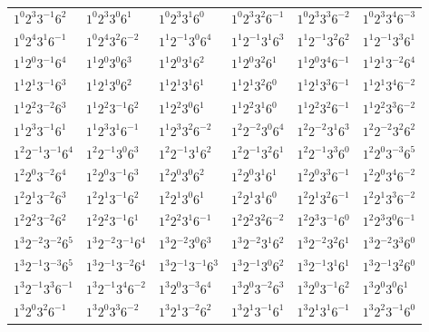 \documentclass[12pt]{amsart}
\numberwithin{equation}{section}
\theoremstyle{plain}
\theoremstyle{definition}
\theoremstyle{remark}
\begin{document}
\begin{longtable}{llllll}
$1^{0}2^{3}3^{-1}6^{2}$ & $1^{0}2^{3}3^{0}6^{1}$ & $1^{0}2^{3}3^{1}6^{0}$ & $1^{0}2^{3}3^{2}6^{-1}$ & $1^{0}2^{3}3^{3}6^{-2}$ & $1^{0}2^{3}3^{4}6^{-3}$\\
$1^{0}2^{4}3^{1}6^{-1}$ & $1^{0}2^{4}3^{2}6^{-2}$ & $1^{1}2^{-1}3^{0}6^{4}$ & $1^{1}2^{-1}3^{1}6^{3}$ & $1^{1}2^{-1}3^{2}6^{2}$ & $1^{1}2^{-1}3^{3}6^{1}$\\
$1^{1}2^{0}3^{-1}6^{4}$ & $1^{1}2^{0}3^{0}6^{3}$ & $1^{1}2^{0}3^{1}6^{2}$ & $1^{1}2^{0}3^{2}6^{1}$ & $1^{1}2^{0}3^{4}6^{-1}$ & $1^{1}2^{1}3^{-2}6^{4}$\\
$1^{1}2^{1}3^{-1}6^{3}$ & $1^{1}2^{1}3^{0}6^{2}$ & $1^{1}2^{1}3^{1}6^{1}$ & $1^{1}2^{1}3^{2}6^{0}$ & $1^{1}2^{1}3^{3}6^{-1}$ & $1^{1}2^{1}3^{4}6^{-2}$\\
$1^{1}2^{2}3^{-2}6^{3}$ & $1^{1}2^{2}3^{-1}6^{2}$ & $1^{1}2^{2}3^{0}6^{1}$ & $1^{1}2^{2}3^{1}6^{0}$ & $1^{1}2^{2}3^{2}6^{-1}$ & $1^{1}2^{2}3^{3}6^{-2}$\\
$1^{1}2^{3}3^{-1}6^{1}$ & $1^{1}2^{3}3^{1}6^{-1}$ & $1^{1}2^{3}3^{2}6^{-2}$ & $1^{2}2^{-2}3^{0}6^{4}$ & $1^{2}2^{-2}3^{1}6^{3}$ & $1^{2}2^{-2}3^{2}6^{2}$\\
$1^{2}2^{-1}3^{-1}6^{4}$ & $1^{2}2^{-1}3^{0}6^{3}$ & $1^{2}2^{-1}3^{1}6^{2}$ & $1^{2}2^{-1}3^{2}6^{1}$ & $1^{2}2^{-1}3^{3}6^{0}$ & $1^{2}2^{0}3^{-3}6^{5}$\\
$1^{2}2^{0}3^{-2}6^{4}$ & $1^{2}2^{0}3^{-1}6^{3}$ & $1^{2}2^{0}3^{0}6^{2}$ & $1^{2}2^{0}3^{1}6^{1}$ & $1^{2}2^{0}3^{3}6^{-1}$ & $1^{2}2^{0}3^{4}6^{-2}$\\
$1^{2}2^{1}3^{-2}6^{3}$ & $1^{2}2^{1}3^{-1}6^{2}$ & $1^{2}2^{1}3^{0}6^{1}$ & $1^{2}2^{1}3^{1}6^{0}$ & $1^{2}2^{1}3^{2}6^{-1}$ & $1^{2}2^{1}3^{3}6^{-2}$\\
$1^{2}2^{2}3^{-2}6^{2}$ & $1^{2}2^{2}3^{-1}6^{1}$ & $1^{2}2^{2}3^{1}6^{-1}$ & $1^{2}2^{2}3^{2}6^{-2}$ & $1^{2}2^{3}3^{-1}6^{0}$ & $1^{2}2^{3}3^{0}6^{-1}$\\
$1^{3}2^{-2}3^{-2}6^{5}$ & $1^{3}2^{-2}3^{-1}6^{4}$ & $1^{3}2^{-2}3^{0}6^{3}$ & $1^{3}2^{-2}3^{1}6^{2}$ & $1^{3}2^{-2}3^{2}6^{1}$ & $1^{3}2^{-2}3^{3}6^{0}$\\
$1^{3}2^{-1}3^{-3}6^{5}$ & $1^{3}2^{-1}3^{-2}6^{4}$ & $1^{3}2^{-1}3^{-1}6^{3}$ & $1^{3}2^{-1}3^{0}6^{2}$ & $1^{3}2^{-1}3^{1}6^{1}$ & $1^{3}2^{-1}3^{2}6^{0}$\\
$1^{3}2^{-1}3^{3}6^{-1}$ & $1^{3}2^{-1}3^{4}6^{-2}$ & $1^{3}2^{0}3^{-3}6^{4}$ & $1^{3}2^{0}3^{-2}6^{3}$ & $1^{3}2^{0}3^{-1}6^{2}$ & $1^{3}2^{0}3^{0}6^{1}$\\
$1^{3}2^{0}3^{2}6^{-1}$ & $1^{3}2^{0}3^{3}6^{-2}$ & $1^{3}2^{1}3^{-2}6^{2}$ & $1^{3}2^{1}3^{-1}6^{1}$ & $1^{3}2^{1}3^{1}6^{-1}$ & $1^{3}2^{2}3^{-1}6^{0}$\\

\end{longtable}
\end{document}
